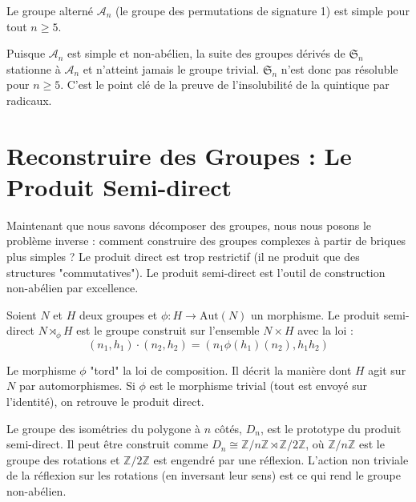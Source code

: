 \begin{theorem}
    Le groupe alterné $\mathcal{A}_n$ (le groupe des permutations de signature 1) est simple pour tout $n \geq 5$.
\end{theorem}

\begin{corollary}
    Puisque $\mathcal{A}_n$ est simple et non-abélien, la suite des groupes dérivés de $\mathfrak{S}_n$ stationne à $\mathcal{A}_n$ et n'atteint jamais le groupe trivial. $\mathfrak{S}_n$ n'est donc pas résoluble pour $n \geq 5$. C'est le point clé de la preuve de l'insolubilité de la quintique par radicaux.
\end{corollary}

\section{Reconstruire des Groupes : Le Produit Semi-direct}

\begin{objectif}
    Maintenant que nous savons décomposer des groupes, nous nous posons le problème inverse : comment construire des groupes complexes à partir de briques plus simples ? Le produit direct est trop restrictif (il ne produit que des structures "commutatives"). Le produit semi-direct est l'outil de construction non-abélien par excellence.
\end{objectif}

\begin{definition}
    Soient $N$ et $H$ deux groupes et $\phi: H \to \mathrm{Aut}(N)$ un morphisme. Le produit semi-direct $N \rtimes_\phi H$ est le groupe construit sur l'ensemble $N \times H$ avec la loi :
    $$(n_1, h_1) \cdot (n_2, h_2) = (n_1 \phi(h_1)(n_2), h_1 h_2)$$
\end{definition}

\begin{remark}
    Le morphisme $\phi$ "tord" la loi de composition. Il décrit la manière dont $H$ agit sur $N$ par automorphismes. Si $\phi$ est le morphisme trivial (tout est envoyé sur l'identité), on retrouve le produit direct.
\end{remark}

\begin{example}
    Le groupe des isométries du polygone à $n$ côtés, $D_n$, est le prototype du produit semi-direct. Il peut être construit comme $D_n \cong \mathbb{Z}/n\mathbb{Z} \rtimes \mathbb{Z}/2\mathbb{Z}$, où $\mathbb{Z}/n\mathbb{Z}$ est le groupe des rotations et $\mathbb{Z}/2\mathbb{Z}$ est engendré par une réflexion. L'action non triviale de la réflexion sur les rotations (en inversant leur sens) est ce qui rend le groupe non-abélien.
\end{example}